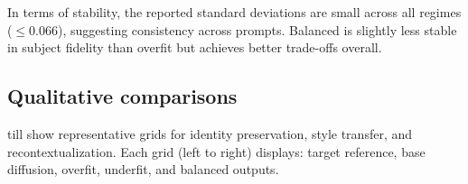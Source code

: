 \documentclass[11pt]{article}
\begin{document}
In terms of stability, the reported standard deviations are small across all regimes ($\leq 0.066$), suggesting consistency across prompts. Balanced is slightly less stable in subject fidelity than overfit but achieves better trade-offs overall.



\subsection{Qualitative comparisons}
 till  show representative grids for identity preservation, style transfer, and recontextualization. Each grid (left to right) displays: target reference, base diffusion, overfit, underfit, and balanced outputs.
\end{document}
